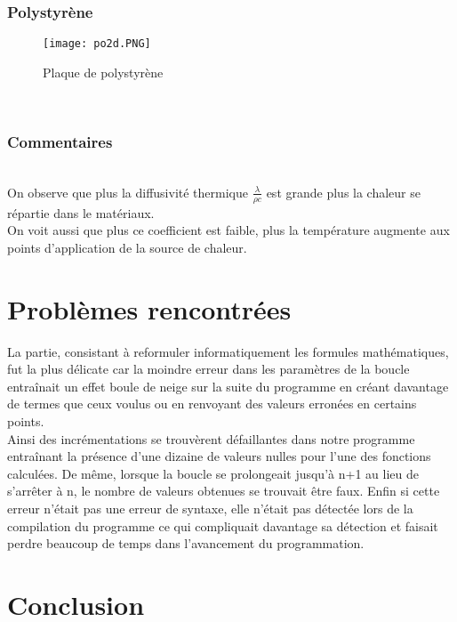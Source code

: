 \documentclass[french]{report}
\begin{document}
\subsection{Polystyrène}
\begin{figure}[htbp] 
   \begin{center} 
      \texttt{[image: po2d.PNG]} 
   \end{center} 
   \caption{\footnotesize Plaque de polystyrène} 
\end{figure} \\

\subsection{Commentaires}\\

On observe  que plus la diffusivité thermique $\frac{\lambda}{\rho c}$ est grande 
plus la chaleur se répartie dans le matériaux.\\

On voit aussi que plus ce coefficient est faible, plus la température augmente aux points d’application de la source de chaleur.\\

    \chapter{Problèmes rencontrées}
La partie, consistant à reformuler
informatiquement les formules mathématiques, fut la plus délicate car la moindre
erreur dans les paramètres de la boucle entraînait un effet boule de neige sur la suite du
programme en créant davantage de termes que ceux voulus ou en renvoyant des valeurs
erronées en certains points.\\
    Ainsi des incrémentations se trouvèrent
    défaillantes dans notre programme entraînant la
présence d'une dizaine de valeurs nulles pour l'une des fonctions calculées. De même,
lorsque la boucle se prolongeait jusqu'à n+1 au lieu de s'arrêter à n, le nombre de valeurs
obtenues se trouvait être faux. Enfin si cette erreur n'était pas une erreur de syntaxe, elle n'était pas détectée lors de la compilation du programme ce qui compliquait davantage sa détection et faisait perdre beaucoup de temps dans l'avancement du programmation.



\chapter{Conclusion}
\end{document}
